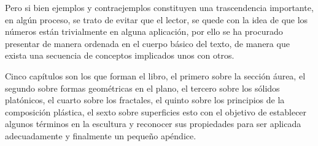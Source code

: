 \documentclass[a4paper]{book}
\begin{document}
Pero si bien ejemplos y contraejemplos constituyen una trascendencia
importante, en algún proceso, se trato de evitar que el lector, se quede con
la idea de que los números están trivialmente en alguna aplicación, por
ello se ha procurado presentar de manera ordenada en el cuerpo básico del
texto, de manera que exista una secuencia de conceptos implicados unos
con otros.

Cinco capítulos son los que forman el libro, el primero sobre la sección
áurea, el segundo sobre formas geométricas en el plano, el tercero sobre los
sólidos platónicos, el cuarto sobre los fractales, el quinto sobre los principios
de la composición plástica, el sexto sobre superficies esto con el objetivo de
establecer algunos términos en la escultura y reconocer sus propiedades
para ser aplicada adecuadamente y finalmente un pequeño apéndice.

















\printindex



\appendix
{}
\setcounter{page}{1}

\end{document}

